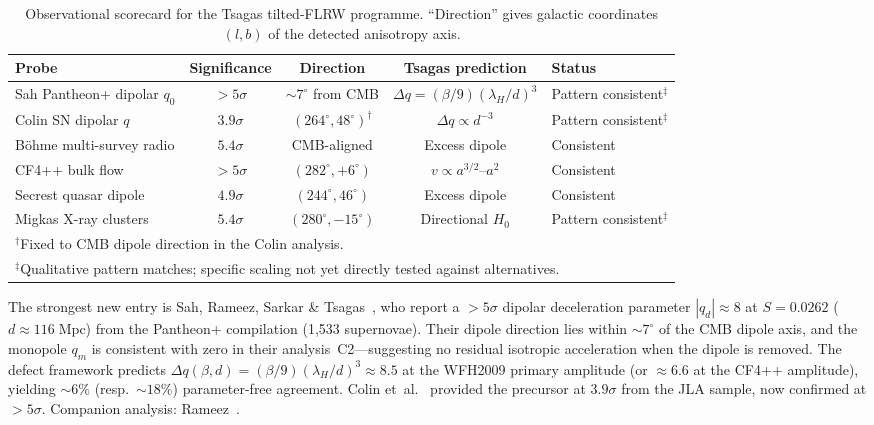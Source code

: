 \begin{table}[t]
\centering
\footnotesize
\setlength{\tabcolsep}{3pt}
\caption{Observational scorecard for the Tsagas tilted-FLRW
programme.  ``Direction'' gives galactic coordinates
$(l, b)$ of the detected anisotropy axis.}
\label{tab:disc-scorecard}
\begin{tabular}{lcccl}
\toprule
Probe & Significance & Direction &
  Tsagas prediction & Status \\
\midrule
Sah Pantheon+ dipolar $q_0$
  & $>5\sigma$ & $\sim 7^\circ$ from CMB
  & $\Delta q = (\beta/9)(\lambda_H/d)^3$ & Pattern consistent$^{\ddagger}$ \\
Colin SN dipolar $q$
  & $3.9\sigma$ & $(264^\circ, 48^\circ)^{\dagger}$
  & $\Delta q \propto d^{-3}$ & Pattern consistent$^{\ddagger}$ \\
B\"ohme multi-survey radio
  & $5.4\sigma$ & CMB-aligned
  & Excess dipole & Consistent \\
CF4++ bulk flow
  & $>5\sigma$ & $(282^\circ, +6^\circ)$
  & $v \propto a^{3/2}\text{--}a^2$ & Consistent \\
Secrest quasar dipole
  & $4.9\sigma$ & $(244^\circ, 46^\circ)$
  & Excess dipole & Consistent \\
Migkas X-ray clusters
  & $5.4\sigma$ & $(280^\circ, -15^\circ)$
  & Directional $H_0$ & Pattern consistent$^{\ddagger}$ \\
\bottomrule
\multicolumn{5}{l}{\scriptsize $^{\dagger}$Fixed to CMB dipole
direction in the Colin analysis.}\\
\multicolumn{5}{l}{\scriptsize $^{\ddagger}$Qualitative pattern
matches; specific scaling not yet directly tested against
alternatives.}
\end{tabular}
\end{table}

The strongest new entry is Sah, Rameez, Sarkar \&
Tsagas~\cite{Sah2025}, who report a $>5\sigma$ dipolar
deceleration parameter $|q_d| \approx 8$ at
$S = 0.0262$ ($d \approx 116\;\mathrm{Mpc}$) from the
Pantheon+ compilation (1,533 supernovae).  Their dipole
direction lies within $\sim 7^\circ$ of the CMB dipole
axis, and the monopole $q_m$ is consistent with zero in
their analysis~C2---suggesting no residual isotropic
acceleration when the dipole is removed.  The defect
framework predicts $\Delta q(\beta, d) = (\beta/9)
(\lambda_H/d)^3 \approx 8.5$ at the WFH2009 primary amplitude (or
$\approx 6.6$ at the CF4++ amplitude), yielding
$\sim\!6\%$ (resp.\ $\sim\!18\%$) parameter-free agreement.
Colin et~al.~\cite{Colin2019} provided the precursor at
$3.9\sigma$ from the JLA sample, now confirmed at
$>5\sigma$.  Companion analysis:
Rameez~\cite{Rameez2024}.

